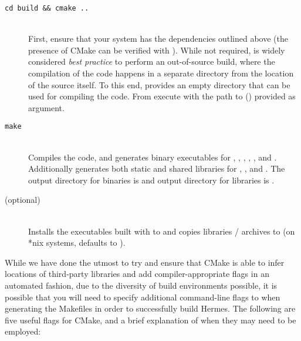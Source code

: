 \documentclass[11pt]{article}
\begin{document}

\begin{description}
  \item[{\tt cd build \&\& cmake ..}] \hfill \\
    First, ensure that your system has the dependencies outlined above (the presence of CMake can be verified with ). While not required, is widely considered {\em best practice} to perform an out-of-source build, where the compilation of the code happens in a separate directory from the location of the source itself. To this end, \hermes provides an empty  directory that can be used for compiling the code. From  execute  with the path to  () provided as argument.
  \item[{\tt make}] \hfill \\
    Compiles the code, and generates binary executables for \fft, \rnamfpt, \rnaeq, \fftmfpt, \ffteq, and \rateeq. Additionally generates both static and shared libraries for \fft, \rnamfpt, and \rnaeq. The output directory for binaries is  and output directory for libraries is .
  \item[ \textnormal{(optional)}] \hfill \\
    Installs the executables built with  to  and copies libraries / archives to  (on *nix systems,  defaults to ).
\end{description}


While we have done the utmost to try and ensure that CMake is able to infer locations of third-party libraries and add compiler-appropriate flags in an automated fashion, due to the diversity of build environments possible, it is possible that you will need to specify additional command-line flags to  when generating the Makefiles in order to successfully build Hermes. The following are five useful flags for CMake, and a brief explanation of when they may need to be employed:
\end{document}
